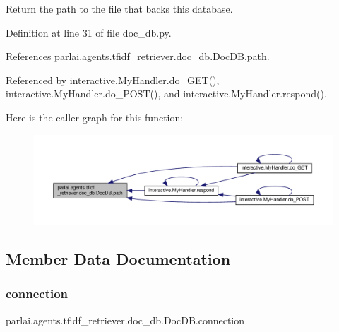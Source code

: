 \begin{DoxyVerb}Return the path to the file that backs this database.\end{DoxyVerb}
 

Definition at line 31 of file doc\+\_\+db.\+py.



References parlai.\+agents.\+tfidf\+\_\+retriever.\+doc\+\_\+db.\+Doc\+D\+B.\+path.



Referenced by interactive.\+My\+Handler.\+do\+\_\+\+G\+E\+T(), interactive.\+My\+Handler.\+do\+\_\+\+P\+O\+S\+T(), and interactive.\+My\+Handler.\+respond().

Here is the caller graph for this function\+:
\nopagebreak
\begin{figure}[H]
\begin{center}
\leavevmode
\includegraphics[width=350pt]{classparlai_1_1agents_1_1tfidf__retriever_1_1doc__db_1_1DocDB_ae3e27c7f804ec3216553b963a0c4e570_icgraph}
\end{center}
\end{figure}


\subsection{Member Data Documentation}
\mbox{\label{classparlai_1_1agents_1_1tfidf__retriever_1_1doc__db_1_1DocDB_aa4fdf07d873ad8779b1b8374adf74a26}} 
\subsubsection{\texorpdfstring{connection}{connection}}
{\footnotesize\ttfamily parlai.\+agents.\+tfidf\+\_\+retriever.\+doc\+\_\+db.\+Doc\+D\+B.\+connection}



